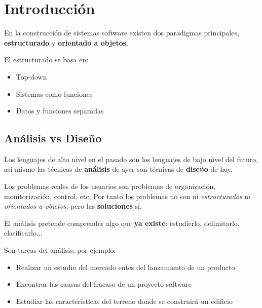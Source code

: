 
\section{Introducción}

En la construcción de sistemas software existen dos paradigmas principales, \textbf{estructurado} y \textbf{orientado a objetos}.

El estructurado se basa en:

\begin{itemize}[noitemsep]
\item Top-down
\item Sistemas como funciones
\item Datos y funciones separadas
\end{itemize}

\subsection{Análisis vs Diseño}

Los lenguajes de alto nivel en el pasado son los lenguajes de bajo nivel del futuro, así mismo las técnicas de \textbf{análisis} de ayer son técnicas de \textbf{diseño} de hoy.

Los problemas reales de los usuarios son problemas de organización, monitorización, control, etc; Por tanto los problemas no son ni \textit{estructurados} ni \textit{orientados a objetos}, pero las \textbf{soluciones} sí.

El análisis pretende comprender algo que \textbf{ya existe}: estudierlo, delimitarlo, clasificarlo...

Son tareas del análisis, por ejemplo:

\begin{itemize}[noitemsep]
\item Realizar un estudio del mercado entes del lanzamiento de un producto
\item Encontrar las causas del fracaso de un proyecto software
\item Estudiar las características del terreno donde se construirá un edificio
\end{itemize}


